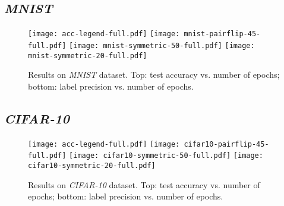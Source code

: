 \documentclass{article}
\begin{document}
{\subsection{\textit{MNIST}}

\begin{figure}[H]
\texttt{[image: acc-legend-full.pdf]}
\texttt{[image: mnist-pairflip-45-full.pdf]}
\texttt{[image: mnist-symmetric-50-full.pdf]}
\texttt{[image: mnist-symmetric-20-full.pdf]}


\vspace{-5px}

\caption{Results on \textit{MNIST} dataset.
	Top: test accuracy vs. number of epochs;
	bottom: label precision vs. number of epochs.}
\label{result-CIFAR10-full}
\end{figure}

\clearpage

\subsection{\textit{CIFAR-10}}

\begin{figure}[H]
\texttt{[image: acc-legend-full.pdf]}
\texttt{[image: cifar10-pairflip-45-full.pdf]}
\texttt{[image: cifar10-symmetric-50-full.pdf]}
\texttt{[image: cifar10-symmetric-20-full.pdf]}




\vspace{-5px}

\caption{Results on \textit{CIFAR-10} dataset.
	Top: test accuracy vs. number of epochs;
bottom: label precision vs. number of epochs.}
\label{result-MNIST-clean}


\end{figure}}
\end{document}
